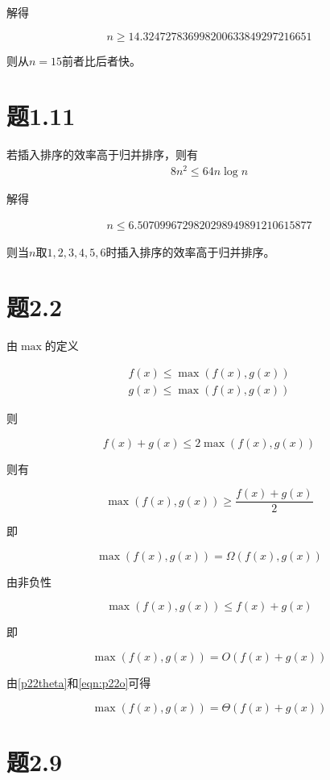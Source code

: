 \documentclass[a4paper,twoside]{article}
\begin{document}
\begin{spacing}{1.2}
解得

$$
n \ge 14.324727836998200633849297216651
$$

则从$n=15$前者比后者快。

\section{题1.11}
若插入排序的效率高于归并排序，则有
\begin{align*}
	8n^2 \le 64n \log n
\end{align*}

解得

\begin{align*}
	n \le 6.5070996729820298949891210615877
\end{align*}

则当$n$取$1,2,3,4,5,6$时插入排序的效率高于归并排序。

\section{题2.2}
由$\max$的定义

\begin{align*}
	f(x) \le \max (f(x),g(x)) \\
	g(x) \le \max (f(x),g(x)) 
\end{align*}

则

$$
f(x)+g(x) \le 2 \max (f(x),g(x))
$$

则有

$$
\max (f(x),g(x)) \ge \frac{f(x)+g(x)}{2}
$$

即

\begin{equation}
	\max (f(x),g(x)) = \Omega (f(x),g(x)) \label{p22theta}
\end{equation}

由非负性

$$
\max (f(x),g(x)) \le f(x)+g(x) 
$$

即

\begin{equation}
	\max (f(x),g(x)) = O (f(x)+g(x)) \label{eqn:p22o}
\end{equation}

由\eqref{p22theta}和\eqref{eqn:p22o}可得


$$
\max (f(x),g(x)) = \Theta (f(x)+g(x)) \label{eqn:p22o}
$$

\section{题2.9}


\end{spacing}
\end{document}
